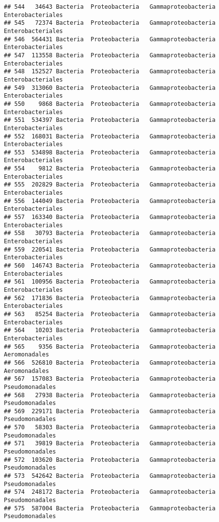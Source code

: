 \documentclass[
]{article}
\begin{document}
\begin{verbatim}
## 544   34643 Bacteria  Proteobacteria   Gammaproteobacteria   Enterobacteriales
## 545   72374 Bacteria  Proteobacteria   Gammaproteobacteria   Enterobacteriales
## 546  564431 Bacteria  Proteobacteria   Gammaproteobacteria   Enterobacteriales
## 547  113558 Bacteria  Proteobacteria   Gammaproteobacteria   Enterobacteriales
## 548  152527 Bacteria  Proteobacteria   Gammaproteobacteria   Enterobacteriales
## 549  313060 Bacteria  Proteobacteria   Gammaproteobacteria   Enterobacteriales
## 550    9868 Bacteria  Proteobacteria   Gammaproteobacteria   Enterobacteriales
## 551  534397 Bacteria  Proteobacteria   Gammaproteobacteria   Enterobacteriales
## 552  168031 Bacteria  Proteobacteria   Gammaproteobacteria   Enterobacteriales
## 553  534898 Bacteria  Proteobacteria   Gammaproteobacteria   Enterobacteriales
## 554    9812 Bacteria  Proteobacteria   Gammaproteobacteria   Enterobacteriales
## 555  202829 Bacteria  Proteobacteria   Gammaproteobacteria   Enterobacteriales
## 556  144049 Bacteria  Proteobacteria   Gammaproteobacteria   Enterobacteriales
## 557  163340 Bacteria  Proteobacteria   Gammaproteobacteria   Enterobacteriales
## 558   30793 Bacteria  Proteobacteria   Gammaproteobacteria   Enterobacteriales
## 559  220541 Bacteria  Proteobacteria   Gammaproteobacteria   Enterobacteriales
## 560  146743 Bacteria  Proteobacteria   Gammaproteobacteria   Enterobacteriales
## 561  100956 Bacteria  Proteobacteria   Gammaproteobacteria   Enterobacteriales
## 562  171836 Bacteria  Proteobacteria   Gammaproteobacteria   Enterobacteriales
## 563   85254 Bacteria  Proteobacteria   Gammaproteobacteria   Enterobacteriales
## 564   10203 Bacteria  Proteobacteria   Gammaproteobacteria   Enterobacteriales
## 565    9356 Bacteria  Proteobacteria   Gammaproteobacteria       Aeromonadales
## 566  526810 Bacteria  Proteobacteria   Gammaproteobacteria       Aeromonadales
## 567  157083 Bacteria  Proteobacteria   Gammaproteobacteria     Pseudomonadales
## 568   27938 Bacteria  Proteobacteria   Gammaproteobacteria     Pseudomonadales
## 569  229171 Bacteria  Proteobacteria   Gammaproteobacteria     Pseudomonadales
## 570   58303 Bacteria  Proteobacteria   Gammaproteobacteria     Pseudomonadales
## 571   39819 Bacteria  Proteobacteria   Gammaproteobacteria     Pseudomonadales
## 572  103620 Bacteria  Proteobacteria   Gammaproteobacteria     Pseudomonadales
## 573  542642 Bacteria  Proteobacteria   Gammaproteobacteria     Pseudomonadales
## 574  248172 Bacteria  Proteobacteria   Gammaproteobacteria     Pseudomonadales
## 575  587004 Bacteria  Proteobacteria   Gammaproteobacteria     Pseudomonadales

\end{verbatim}
\end{document}
